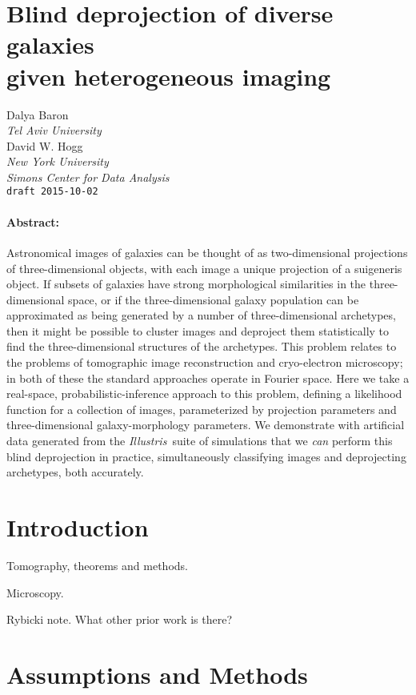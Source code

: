 \documentclass[12pt]{article}
\newcommand{\project}[1]{\textsl{#1}}
\newcommand{\illustris}{\project{Illustris}}
\begin{document}
\section*{Blind deprojection of diverse galaxies \\ given heterogeneous imaging}
\noindent
Dalya Baron \\
\textsl{Tel Aviv University}
\\[1ex]
David W. Hogg \\
\textsl{New York University} \\
\textsl{Simons Center for Data Analysis}
\\[1ex]
\texttt{draft 2015-10-02}

\paragraph{Abstract:}
Astronomical images of galaxies can be thought of as two-di\-men\-sion\-al
projections of three-dimensional objects, with each image a unique
projection of a suigeneris object.
If subsets of galaxies have strong morphological similarities in the
three-dimensional space, or if the three-dimensional galaxy population
can be approximated as being generated by a number of
three-dimensional archetypes, then it might be possible to cluster
images and deproject them statistically to find the three-dimensional
structures of the archetypes.
This problem relates to the problems of tomographic image
reconstruction and cryo-electron microscopy; in both of these the
standard approaches operate in Fourier space.
Here we take a real-space, probabilistic-inference approach to this
problem, defining a likelihood function for a collection of images,
parameterized by projection parameters and three-dimensional
galaxy-morphology parameters.
We demonstrate with artificial data generated from the
\illustris\ suite of simulations that we \emph{can} perform this blind
deprojection in practice, simultaneously classifying images and
deprojecting archetypes, both accurately.

\section{Introduction}

Tomography, theorems and methods.

Microscopy.

Rybicki note.  What other prior work is there?

\section{Assumptions and Methods}
\end{document}
